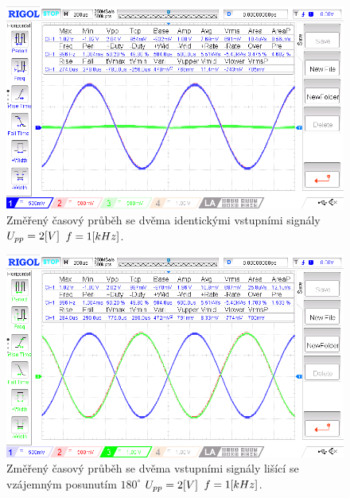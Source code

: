 \documentclass{article}
\begin{document}
\begin{figure}[H]
  \begin{minipage}[t]{0.48\textwidth}
    \centering
    \includegraphics[width=\textwidth]{LAB/NewFile8.png}
    Změřený časový průběh se dvěma identickými vstupními signály \(U_{pp} = 2\-[V]\) \(f = 1\-[kHz]\).
  \end{minipage}
  \hfill
  \begin{minipage}[t]{0.48\textwidth}
    \centering
    \includegraphics[width=\textwidth]{LAB/NewFile9.png}
    Změřený časový průběh se dvěma vstupními signály lišící se vzájemným posunutím \(180^\circ\) \(U_{pp} = 2\-[V]\) \(f = 1\-[kHz]\).
  \end{minipage}
\end{figure}
\end{document}
